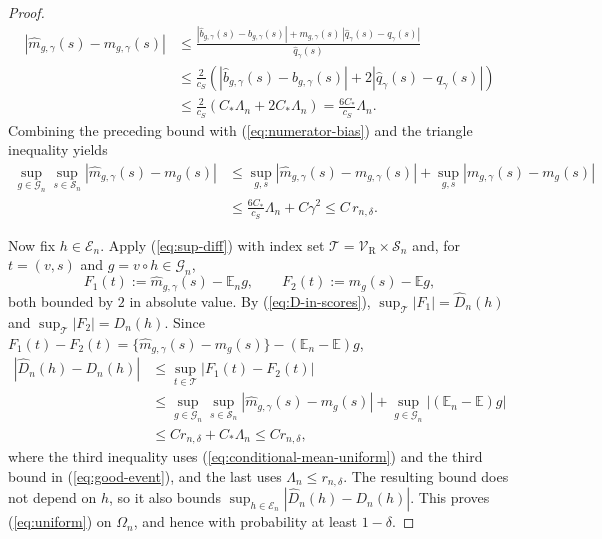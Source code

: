 \documentclass{article} %
\begin{document}
\begin{proof}
\[
\begin{aligned}
  \left|\widehat{m}_{g,\gamma}(s)-m_{g,\gamma}(s)\right|
  &\le\frac{|\widehat{b}_{g,\gamma}(s)-b_{g,\gamma}(s)|
            +m_{g,\gamma}(s)\,|\widehat{q}_{\gamma}(s)-q_{\gamma}(s)|}{\widehat{q}_{\gamma}(s)}
  \\
  &\le\frac{2}{c_S}\left(|\widehat{b}_{g,\gamma}(s)-b_{g,\gamma}(s)|
                        +2|\widehat{q}_{\gamma}(s)-q_{\gamma}(s)|\right)
  \\
  &\le\frac{2}{c_S}\left(C_\ast\Lambda_n+2C_\ast\Lambda_n\right)
  =\frac{6C_\ast}{c_S}\Lambda_n .
\end{aligned}
\]
Combining the preceding bound with (\ref{eq:numerator-bias}) and the triangle inequality yields
\begin{equation}
\begin{aligned}
  \sup_{g\in\mathcal{G}_n}\sup_{s\in\mathcal{S}_n}
  \left|\widehat{m}_{g,\gamma}(s)-m_g(s)\right|
  &\le\sup_{g,s}\left|\widehat{m}_{g,\gamma}(s)-m_{g,\gamma}(s)\right|
   +\sup_{g,s}\left|m_{g,\gamma}(s)-m_g(s)\right|
  \\
  &\le\frac{6C_\ast}{c_S}\Lambda_n+C\gamma^2
  \le C\,r_{n,\delta} .
\end{aligned}
  \label{eq:conditional-mean-uniform}
\end{equation}

Now fix $h\in\mathcal{E}_n$.  Apply (\ref{eq:sup-diff}) with index set $\mathcal{T}=\mathcal{V}_{\mathrm{R}}\times\mathcal{S}_n$ and, for $t=(v,s)$ and $g=v\circ h\in\mathcal{G}_n$,
\[
  F_1(t):=\widehat{m}_{g,\gamma}(s)-\mathbb{E}_ng,
  \qquad
  F_2(t):=m_g(s)-\mathbb{E}g ,
\]
both bounded by $2$ in absolute value.  By (\ref{eq:D-in-scores}), $\sup_{\mathcal{T}}|F_1|=\widehat{D}_n(h)$ and $\sup_{\mathcal{T}}|F_2|=D_n(h)$.  Since $F_1(t)-F_2(t)=\{\widehat{m}_{g,\gamma}(s)-m_g(s)\}-(\mathbb{E}_n-\mathbb{E})g$,
\[
\begin{aligned}
  \left|\widehat{D}_n(h)-D_n(h)\right|
  &\le\sup_{t\in\mathcal{T}}|F_1(t)-F_2(t)|
  \\
  &\le\sup_{g\in\mathcal{G}_n}\sup_{s\in\mathcal{S}_n}
     \left|\widehat{m}_{g,\gamma}(s)-m_g(s)\right|
    +\sup_{g\in\mathcal{G}_n}\left|(\mathbb{E}_n-\mathbb{E})g\right|
  \\
  &\le Cr_{n,\delta}+C_\ast\Lambda_n
  \le Cr_{n,\delta} ,
\end{aligned}
\]
where the third inequality uses (\ref{eq:conditional-mean-uniform}) and the third bound in (\ref{eq:good-event}), and the last uses $\Lambda_n\le r_{n,\delta}$.  The resulting bound does not depend on $h$, so it also bounds $\sup_{h\in\mathcal{E}_n}\left|\widehat{D}_n(h)-D_n(h)\right|$.  This proves (\ref{eq:uniform}) on $\Omega_n$, and hence with probability at least $1-\delta$.


\end{proof}
\end{document}
